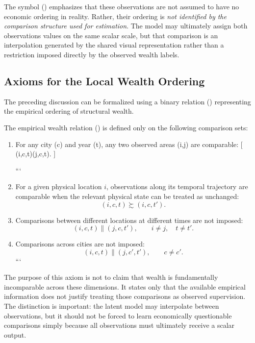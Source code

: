The symbol (\parallel) emphasizes that these observations are not assumed to have no economic ordering in reality. Rather, their ordering is \emph{not identified by the comparison structure used for estimation}. The model may ultimately assign both observations values on the same scalar scale, but that comparison is an interpolation generated by the shared visual representation rather than a restriction imposed directly by the observed wealth labels.

\subsection{Axioms for the Local Wealth Ordering}

The preceding discussion can be formalized using a binary relation (\succsim) representing the empirical ordering of structural wealth.

\begin{axiom}
The empirical wealth relation (\succsim) is defined only on the following comparison sets:

\begin{enumerate}
\item For any city (c) and year (t), any two observed areas (i,j) are comparable:
[
(i,c,t)\succsim(j,c,t).
]

```
\item For a given physical location \(i\), observations along its temporal trajectory are comparable when the relevant physical state can be treated as unchanged:
\[
(i,c,t)\succsim(i,c,t').
\]

\item Comparisons between different locations at different times are not imposed:
\[
(i,c,t)\parallel(j,c,t'),
\qquad i\neq j,\quad t\neq t'.
\]

\item Comparisons across cities are not imposed:
\[
(i,c,t)\parallel(j,c',t'),
\qquad c\neq c'.
\]
```

\end{enumerate}
\end{axiom}

The purpose of this axiom is not to claim that wealth is fundamentally incomparable across these dimensions. It states only that the available empirical information does not justify treating those comparisons as observed supervision. The distinction is important: the latent model may interpolate between observations, but it should not be forced to learn economically questionable comparisons simply because all observations must ultimately receive a scalar output.

